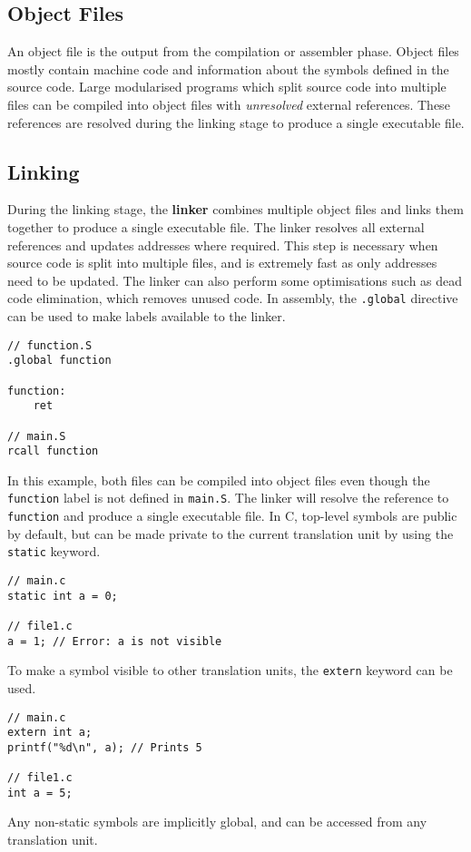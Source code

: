 \documentclass{article}
\begin{document}
\subsection{Object Files}
An object file is the output from the compilation or assembler phase.
Object files mostly contain machine code and information about the
symbols defined in the source code. Large modularised programs which
split source code into multiple files can be compiled into object files
with \textit{unresolved} external references. These references are
resolved during the linking stage to produce a single executable file.
\subsection{Linking}
During the linking stage, the \textbf{linker} combines multiple object
files and links them together to produce a single executable file. The
linker resolves all external references and updates addresses where
required. This step is necessary when source code is split into
multiple files, and is extremely fast as only addresses need to be
updated. The linker can also perform some optimisations such as dead
code elimination, which removes unused code. In assembly, the
\texttt{.global} directive can be used to make labels
available to the linker.
\begin{verbatim}
// function.S
.global function

function:
    ret

// main.S
rcall function
\end{verbatim}
In this example, both files can be compiled into object files even
though the \texttt{function} label is not defined in
\texttt{main.S}. The linker will resolve the reference to
\texttt{function} and produce a single executable file. In C,
top-level symbols are public by default, but can be made private to the
current translation unit by using the \texttt{static} keyword.
\begin{verbatim}
// main.c
static int a = 0;

// file1.c
a = 1; // Error: a is not visible
\end{verbatim}
To make a symbol visible to other translation units, the
\texttt{extern} keyword can be used.
\begin{verbatim}
// main.c
extern int a;
printf("%d\n", a); // Prints 5

// file1.c
int a = 5;
\end{verbatim}
Any non-static symbols are implicitly global, and can be accessed from
any translation unit.
\end{document}
